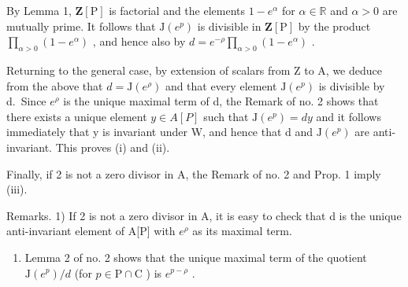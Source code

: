By Lemma 1, \(\mathbf{Z}[\mathrm{P}]\) is factorial and the elements \(1 - e^{\alpha}\) for \(\alpha \in \mathbb{R}\) and \(\alpha > 0\) are mutually prime. It follows that \(\mathrm{J}(e^{p})\) is divisible in \(\mathbf{Z}[\mathrm{P}]\) by the product \(\prod_{\alpha > 0}(1 - e^{\alpha})\) , and hence also by \(d = e^{-\rho}\prod_{\alpha > 0}(1 - e^{\alpha})\) .

Returning to the general case, by extension of scalars from Z to A, we deduce from the above that \(d = \mathrm{J}(e^{\rho})\) and that every element \(\mathrm{J}(e^{p})\) is divisible by d.~Since \(e^{\rho}\) is the unique maximal term of d, the Remark of no. 2 shows that there exists a unique element \(y \in A[P]\) such that \(\mathrm{J}(e^{p}) = dy\) and it follows immediately that y is invariant under W, and hence that d and \(\mathrm{J}(e^{p})\) are anti-invariant. This proves (i) and (ii).

Finally, if 2 is not a zero divisor in A, the Remark of no. 2 and Prop. 1 imply (iii).

Remarks. 1) If 2 is not a zero divisor in A, it is easy to check that d is the unique anti-invariant element of A{[}P{]} with \(e^{\rho}\) as its maximal term.

\begin{enumerate}
\def\labelenumi{\arabic{enumi})}
\setcounter{enumi}{1}
\tightlist
\item
  Lemma 2 of no. 2 shows that the unique maximal term of the quotient \(\mathrm{J}(e^p) / d\) (for \(p\in \mathrm{P}\cap \mathrm{C}\) ) is \(e^{p - \rho}\) .
\end{enumerate}


